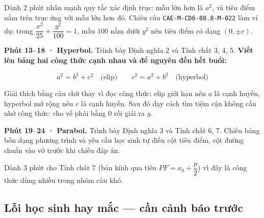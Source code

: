 \documentclass[11pt, a4paper]{article}
\begin{document}
Dành 2 phút nhấn mạnh quy tắc xác định trục: mẫu lớn hơn là $a^2$, và tiêu điểm nằm trên trục ứng với mẫu lớn hơn đó. Chiếu câu \texttt{CAE-M-CD6-08.8-M-022} làm ví dụ: trong $\dfrac{x^2}{25} + \dfrac{y^2}{100} = 1$, mẫu $100$ nằm dưới $y^2$ nên tiêu điểm có dạng $(0, \pm c)$.

\textbf{Phút 13–18 · Hyperbol.} Trình bày Định nghĩa 2 và Tính chất 3, 4, 5. \textbf{Viết lên bảng hai công thức cạnh nhau và để nguyên đến hết buổi:}

$$a^2 = b^2 + c^2 \quad \text{(elip)} \qquad c^2 = a^2 + b^2 \quad \text{(hyperbol)}$$

Giải thích bằng câu chữ thay vì đọc công thức: elip giới hạn nên $a$ là cạnh huyền, hyperbol mở rộng nên $c$ là cạnh huyền. Sau đó dạy cách tìm tiệm cận không cần nhớ công thức: cho vế phải bằng $0$ rồi giải ra $y$.

\textbf{Phút 19–24 · Parabol.} Trình bày Định nghĩa 3 và Tính chất 6, 7. Chiếu bảng bốn dạng phương trình và yêu cầu học sinh tự điền cột tiêu điểm, cột đường chuẩn vào vở trước khi chiếu đáp án.

Dành 3 phút cho Tính chất 7 (bán kính qua tiêu $PF = x_0 + \dfrac{p}{2}$) vì đây là công thức dùng nhiều trong nhóm câu khó.

\subsection{Lỗi học sinh hay mắc — cần cảnh báo trước}

\end{document}
